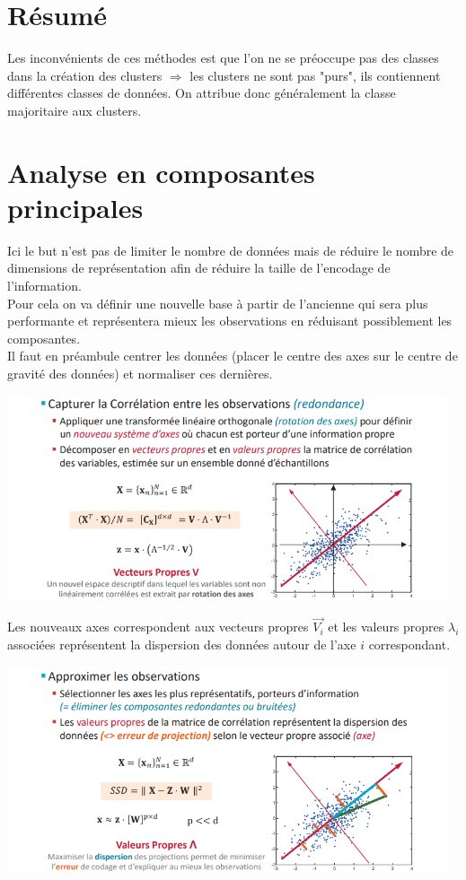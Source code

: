 \documentclass[a4paper,12pt,oneside]{report}	%
\begin{document}
    \section*{Résumé}
        Les inconvénients de ces méthodes est que l'on ne se préoccupe pas des classes dans la création des clusters $\Rightarrow$ les clusters ne sont pas "purs", ils contiennent différentes classes de données. On attribue donc généralement la classe majoritaire aux clusters.
    \section{Analyse en composantes principales}
        Ici le but n'est pas de limiter le nombre de données mais de réduire le nombre de dimensions de représentation afin de réduire la taille de l'encodage de l'information.\\
        Pour cela on va définir une nouvelle base à partir de l'ancienne qui sera plus performante et représentera mieux les observations en réduisant possiblement les composantes.\\
        Il faut en préambule centrer les données (placer le centre des axes sur le centre de gravité des données) et normaliser ces dernières.
        \begin{center}
            \includegraphics[width=13cm]{LaTeX/pictures/2.7_1.png}
        \end{center}
        Les nouveaux axes correspondent aux vecteurs propres $\vec{V_i} $ et les valeurs propres $\lambda_i$ associées représentent la dispersion des données autour de l'axe $i$ correspondant.
        \begin{center}
            \includegraphics[width=13cm]{LaTeX/pictures/2.7_2.png}
        \end{center}
\end{document}
